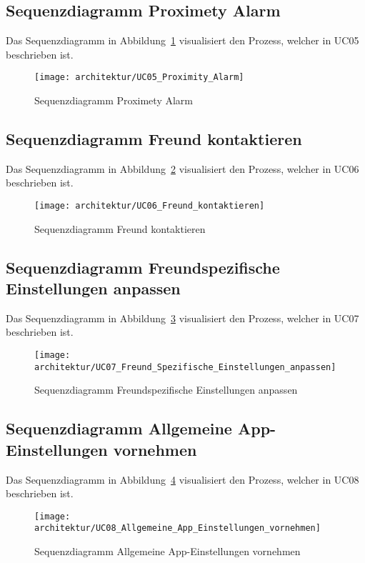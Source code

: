\FloatBarrier
\subsection{Sequenzdiagramm Proximety Alarm}
Das Sequenzdiagramm in Abbildung~\ref{fig:UC05_Proximity_Alarm} visualisiert den Prozess, welcher in UC05 beschrieben ist.
\begin{figure}[H]
	\centering
		\texttt{[image: architektur/UC05\_Proximity\_Alarm]}
	\caption{Sequenzdiagramm Proximety Alarm}
	\label{fig:UC05_Proximity_Alarm}
\end{figure}

\FloatBarrier
\subsection{Sequenzdiagramm Freund kontaktieren}
Das Sequenzdiagramm in Abbildung~\ref{fig:UC06_Freund_kontaktieren} visualisiert den Prozess, welcher in UC06 beschrieben ist.
\begin{figure}[H]
	\centering
		\texttt{[image: architektur/UC06\_Freund\_kontaktieren]}
	\caption{Sequenzdiagramm Freund kontaktieren}
	\label{fig:UC06_Freund_kontaktieren}
\end{figure}

\FloatBarrier
\subsection{Sequenzdiagramm Freundspezifische Einstellungen anpassen}
Das Sequenzdiagramm in Abbildung~\ref{fig:UC07_Freund_Spezifische_Einstellungen_anpassen} visualisiert den Prozess, welcher in UC07 beschrieben ist.
\begin{figure}[H]
	\centering
		\texttt{[image: architektur/UC07\_Freund\_Spezifische\_Einstellungen\_anpassen]}
	\caption{Sequenzdiagramm Freundspezifische Einstellungen anpassen}
	\label{fig:UC07_Freund_Spezifische_Einstellungen_anpassen}
\end{figure}

\FloatBarrier
\subsection{Sequenzdiagramm Allgemeine App-Einstellungen vornehmen}
Das Sequenzdiagramm in Abbildung~\ref{fig:UC08_Allgemeine_App_Einstellungen_vornehmen} visualisiert den Prozess, welcher in UC08 beschrieben ist.
\begin{figure}[H]
	\centering
		\texttt{[image: architektur/UC08\_Allgemeine\_App\_Einstellungen\_vornehmen]}
	\caption{Sequenzdiagramm Allgemeine App-Einstellungen vornehmen}
	\label{fig:UC08_Allgemeine_App_Einstellungen_vornehmen}
\end{figure}